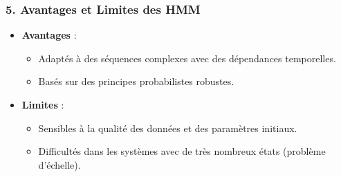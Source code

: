 \documentclass[a4paper,12pt,oneside]{report}	%
\begin{document}
            \subsubsection{5. Avantages et Limites des HMM}
                \begin{itemize}
                    \item \textbf{Avantages} :
                        \begin{itemize}
                            \item Adaptés à des séquences complexes avec des dépendances temporelles.
                            \item Basés sur des principes probabilistes robustes.
                        \end{itemize}
                    \item \textbf{Limites} :
                        \begin{itemize}
                            \item Sensibles à la qualité des données et des paramètres initiaux.
                            \item Difficultés dans les systèmes avec de très nombreux états (problème d’échelle).
                        \end{itemize}
                \end{itemize}
\end{document}

